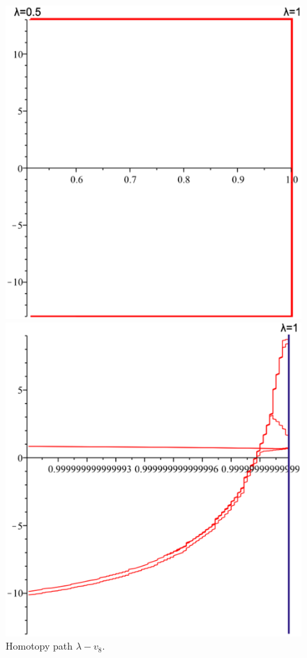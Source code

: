 \documentclass[conference,letterpaper,onecolumn]{IEEEtran}
\begin{document}
{\begin{figure}
\centering
\begin{minipage}[c]{0.5\linewidth}
	\centering
	\includegraphics[scale=0.3]{ejem4lim/YAMAMURAV8A.eps}
\end{minipage}%
\hspace{-0.05in}
\begin{minipage}[c]{0.5\linewidth}
	\centering
	\includegraphics[scale=0.3]{ejem4lim/YAMAMURAV8.eps}
\end{minipage}
\caption{Homotopy path $\lambda-v_8$.}
\label{yamaie}
\end{figure}


}
\end{document}

